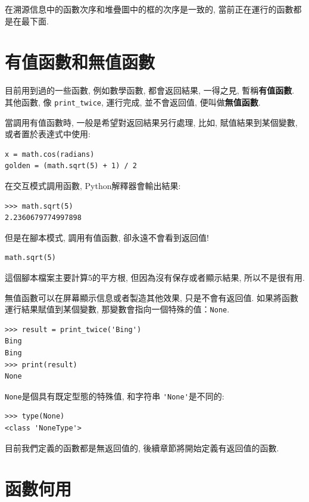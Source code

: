 \documentclass[10pt]{book}
\begin{document}
在溯源信息中的函數次序和堆疊圖中的框的次序是一致的, 
當前正在運行的函數都是在最下面. 

\section{有值函數和無值函數}

目前用到過的一些函數, 例如數學函數, 都會返回結果, 
一得之見, 暫稱{\bf 有值函數}. 其他函數, 像 \verb"print_twice", 
運行完成, 並不會返回值, 便叫做{\bf 無值函數}. 

當調用有值函數時, 一般是希望對返回結果另行處理, 比如, 
賦值結果到某個變數, 或者置於表達式中使用:

\begin{verbatim}
x = math.cos(radians)
golden = (math.sqrt(5) + 1) / 2
\end{verbatim}
%
在交互模式調用函數, Python解釋器會輸出結果:

\begin{verbatim}
>>> math.sqrt(5)
2.2360679774997898
\end{verbatim}
%
但是在腳本模式, 調用有值函數, 卻永遠不會看到返回值!

\begin{verbatim}
math.sqrt(5)
\end{verbatim}
%
這個腳本檔案主要計算5的平方根, 但因為沒有保存或者顯示結果, 所以不是很有用. 

無值函數可以在屏幕顯示信息或者製造其他效果, 
只是不會有返回值. 如果將函數運行結果賦值到某個變數, 
那變數會指向一個特殊的值：{\tt None}.

\begin{verbatim}
>>> result = print_twice('Bing')
Bing
Bing
>>> print(result)
None
\end{verbatim}
%
{\tt None}是個具有既定型態的特殊值, 和字符串 \verb"'None'"是不同的:

\begin{verbatim}
>>> type(None)
<class 'NoneType'>
\end{verbatim}
%
目前我們定義的函數都是無返回值的, 後續章節將開始定義有返回值的函數. 


\section{函數何用}
\end{document}
